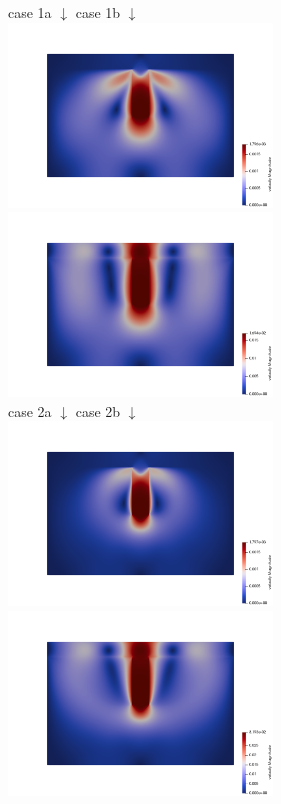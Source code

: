 \newpage

\begin{center}
case 1a $\downarrow$ \hspace{7cm} case 1b $\downarrow$\\
\includegraphics[width=7cm]{python_codes/fieldstone_26/results/case1a_vel}
\includegraphics[width=7cm]{python_codes/fieldstone_26/results/case1b_vel}\\
case 2a $\downarrow$ \hspace{7cm} case 2b $\downarrow$\\
\includegraphics[width=7cm]{python_codes/fieldstone_26/results/case2a_vel}
\includegraphics[width=7cm]{python_codes/fieldstone_26/results/case2b_vel}
\end{center}

